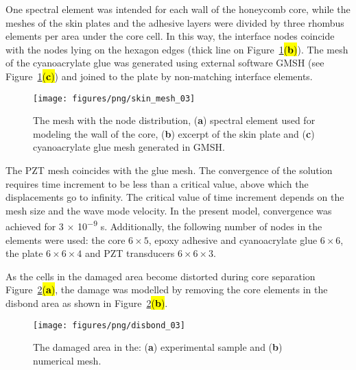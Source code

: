 \documentclass[sensors,article,accept,moreauthors,pdftex]{Definitions/mdpi}
\begin{document}
\begin{paracol}{2}
One spectral element was intended for each wall of the honeycomb core, while the meshes of the skin plates and the adhesive layers were divided by three rhombus elements per area under the core cell.
In this way, the interface nodes coincide with the nodes lying on the hexagon edges (thick line on Figure~\ref{fig:skin_mesh}\hl{(\textbf{b})}). %
The mesh of the cyanoacrylate glue was generated using external software GMSH \cite{geuzaine2009gmsh} (see Figure~\ref{fig:skin_mesh}\hl{(\textbf{c})}) and joined to the plate by non-matching interface elements.

\vspace{-6pt}
\begin{figure}[H]
		\texttt{[image: figures/png/skin\_mesh\_03]}
	\caption{The mesh with the node distribution, (\textbf{a}) spectral element used for modeling the wall of the core, (\textbf{b}) excerpt of the skin plate and (\textbf{c}) cyanoacrylate glue mesh generated in GMSH.}
	\label{fig:skin_mesh}
\end{figure}


 The PZT mesh coincides with the glue mesh.
The convergence of the solution requires time increment to be less than a critical value, above which the displacements go to infinity.
The critical value of time increment depends on the mesh size and the wave mode velocity.
In the present model, convergence was achieved for 3 $\times$ 10\textsuperscript{$-$9} s.
Additionally, the following number of nodes in the elements were used: the core \(6 \times 5\), epoxy adhesive and cyanoacrylate glue \(6 \times 6\), the plate \(6 \times 6 \times 4\) and PZT transducers \(6 \times 6 \times 3\).

As the cells in the damaged area become distorted during core separation Figure~\ref{fig:disbond}\hl{(\textbf{a})}, %
the damage was modelled by removing the core elements in the disbond area as shown in Figure~\ref{fig:disbond}\hl{(\textbf{b})}.
\begin{figure}[H]
		\texttt{[image: figures/png/disbond\_03]}
	\caption{The damaged area in the: (\textbf{a}) experimental sample and (\textbf{b}) numerical mesh.}
	\label{fig:disbond}
\end{figure}


\end{paracol}
\end{document}
